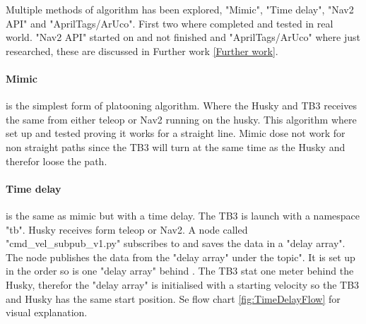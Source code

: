 Multiple methods of algorithm has been explored, "Mimic", "Time delay", "Nav2 API" and "AprilTags/ArUco". First two where completed and tested in real world. "Nav2 API" started on and not finished and "AprilTags/ArUco" where just researched, these are discussed in Further work \ref{Further work}. 

\paragraph{Mimic} \label{Mimic} is the simplest form of platooning algorithm.  Where the Husky and TB3 receives the same  from either teleop or Nav2 running on the husky.  This algorithm where set up and tested proving it works for a straight line. Mimic dose not work for non straight paths since the TB3 will turn at the same time as the Husky and therefor loose the path.

\paragraph{Time delay} \label{Time delay} is the same as mimic but with a time delay. The TB3 is launch with a namespace "tb". Husky receives  form teleop or Nav2. A node called "cmd\_vel\_subpub\_v1.py" subscribes to  and saves the data in a "delay array". The node publishes the data from the "delay array" under the  topic". It is set up in the order so  is one "delay array" behind . The TB3 stat one meter behind the Husky, therefor the "delay array" is initialised with a starting velocity so the TB3 and Husky has the same start position. Se flow chart \ref{fig:TimeDelayFlow} for visual explanation.

